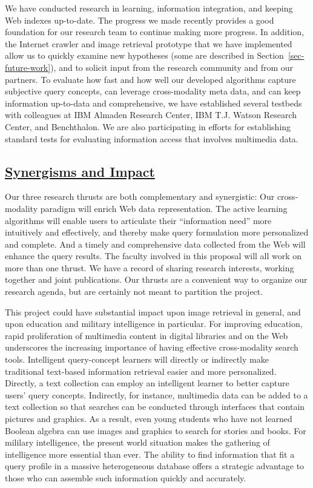 We have conducted research in learning, information integration, and
keeping Web indexes up-to-date.  The progress we made recently
provides a good foundation for our research team to continue making
more progress. In addition, the Internet crawler and 
image retrieval prototype
\cite{demo-Sigmod01,demo-ACMmm01} that we have implemented allow us
to quickly examine new hypotheses (some are described in
Section~\ref{sec-future-work}), and to solicit input from the research
community and from our partners.  To evaluate how fast and how well
our developed algorithms capture subjective query concepts, can
leverage cross-modality meta data, and can keep information up-to-data
and comprehensive, we have established several testbeds with
colleagues at IBM Almaden Research Center, IBM T.J. Watson Research
Center, and Benchthalon.  We are also participating in efforts
\cite{Bench01} for establishing standard tests \cite{Benchathlon} for
evaluating information access that involves multimedia data.

\subsection*{\underline{Synergisms and Impact}}

Our three research thrusts are both complementary and synergistic:
Our cross-modality paradigm will enrich Web data representation.
The active learning algorithms will enable users to articulate their 
``information need'' more intuitively and effectively, and thereby
make query formulation more personalized and complete.
And a timely and comprehensive data collected from the Web 
will enhance the query results.
The faculty involved in this proposal will all work on more than one thrust.
We have a record of sharing research interests, working together
and joint publications. Our thrusts are a convenient way to
organize our research agenda, but are certainly not meant to partition 
the project.

This project could have substantial
impact upon image retrieval in general, and
upon education and military intelligence in particular.
For improving education,
rapid proliferation of multimedia
content in digital libraries and on the Web underscores the increasing
importance of having effective cross-modality search tools.  
Intelligent query-concept learners will directly or indirectly make
traditional text-based information retrieval easier and more
personalized.  Directly, a text collection can employ an intelligent
learner to better capture users' query concepts.  Indirectly, for
instance, multimedia data can be added to a text collection so that
searches can be conducted through interfaces that contain pictures and
graphics. As a result, even young students who have not learned 
Boolean algebra can use images and graphics to search for stories 
and books.  For mililary intelligence,
the present world situation makes the gathering of intelligence
more essential than ever.  The ability to find
information that fit a query profile
in a massive heterogeneous database offers a strategic
advantage to those who can assemble such information
quickly and accurately.  

